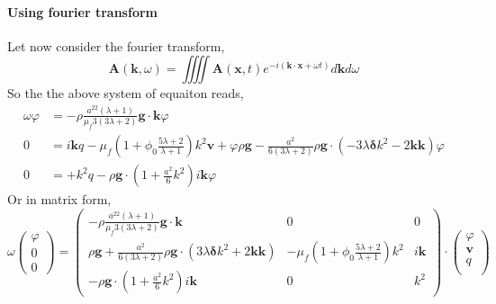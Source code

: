 \paragraph*{Using fourier transform}
Let now consider the fourier transform, 
\begin{equation}
    \textbf{A}(\textbf{k},\omega)
    =
    \iiiint
    \textbf{A}(\textbf{x},t)
    e^{-i(\textbf{k}\cdot \textbf{x} + \omega t)}
    d\textbf{k}d\omega
\end{equation}
So the the above system of equaiton reads, 
\begin{align}
    \omega \varphi &= - \rho \frac{a^22(\lambda+1)}{\mu_f 3(3\lambda+2)}\textbf{g}\cdot \textbf{k} \varphi \\
    0 &= 
    i \textbf{k}  q
    - \mu_f (1+\phi_0 \frac{5\lambda +2}{\lambda+1}) k^2\textbf{v}
    + \varphi \rho \textbf{g}
    -  \frac{a^2}{ 6(3\lambda+2)} \rho \textbf{g}\cdot (
    - 3\lambda \bm\delta k^2   
    -  2 \textbf{kk}
    )\varphi\\
    0 &= 
    + k^2 q
    - \rho \textbf{g} \cdot(1 + \frac{a^2}{6}k^2) i\textbf{k} \varphi 
\end{align}
Or in matrix form, 
\begin{equation}
    \omega
    \begin{pmatrix}
        \varphi\\
        0\\
        0
    \end{pmatrix}
    =
    \begin{pmatrix}
        - \rho \frac{a^22(\lambda+1)}{\mu_f 3(3\lambda+2)}\textbf{g}\cdot \textbf{k}
        & 0 & 0 \\
        \rho \textbf{g}
        + \frac{a^2}{ 6(3\lambda+2)} \rho \textbf{g}\cdot (
        3\lambda \bm\delta k^2   
        +  2 \textbf{kk}
        )
        &
        - \mu_f (1+\phi_0 \frac{5\lambda +2}{\lambda+1}) k^2
        &
        i \textbf{k}  \\
        - \rho \textbf{g} \cdot(1 + \frac{a^2}{6}k^2) i\textbf{k}  
        &
        0
        &k^2 
    \end{pmatrix}
    \cdot 
    \begin{pmatrix}
        \varphi\\    
        \textbf{v}\\    
        q\\    
    \end{pmatrix}
\end{equation}